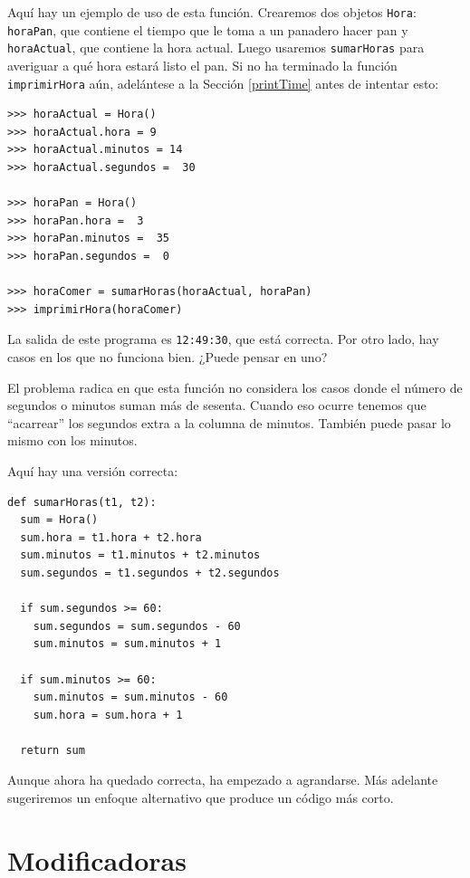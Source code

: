 Aquí hay un ejemplo de uso de esta función. Crearemos dos objetos
\texttt{Hora}: \texttt{horaPan}, que contiene el tiempo que le toma
a un panadero hacer pan y \texttt{horaActual}, que contiene la hora
actual. Luego usaremos \texttt{sumarHoras} para averiguar a qué hora
estará listo el pan. Si no ha terminado la función \texttt{imprimirHora}
aún, adelántese a la Sección \ref{printTime} antes de intentar esto:

\begin{lstlisting}
>>> horaActual = Hora()
>>> horaActual.hora = 9
>>> horaActual.minutos = 14
>>> horaActual.segundos =  30

>>> horaPan = Hora()
>>> horaPan.hora =  3
>>> horaPan.minutos =  35
>>> horaPan.segundos =  0

>>> horaComer = sumarHoras(horaActual, horaPan)
>>> imprimirHora(horaComer)
\end{lstlisting}
 La salida de este programa es \texttt{12:49:30}, que está correcta.
Por otro lado, hay casos en los que no funciona bien. ¿Puede pensar
en uno?

El problema radica en que esta función no considera los casos donde
el número de segundos o minutos suman más de sesenta. Cuando eso ocurre
tenemos que ``acarrear'' los segundos extra a la columna de minutos.
También puede pasar lo mismo con los minutos.

Aquí hay una versión correcta:
\begin{lstlisting}
def sumarHoras(t1, t2):
  sum = Hora()
  sum.hora = t1.hora + t2.hora
  sum.minutos = t1.minutos + t2.minutos
  sum.segundos = t1.segundos + t2.segundos

  if sum.segundos >= 60:
    sum.segundos = sum.segundos - 60
    sum.minutos = sum.minutos + 1

  if sum.minutos >= 60:
    sum.minutos = sum.minutos - 60
    sum.hora = sum.hora + 1

  return sum
\end{lstlisting}
Aunque ahora ha quedado correcta, ha empezado a agrandarse. Más adelante
sugeriremos un enfoque alternativo que produce un código más corto.

\section{Modificadoras}

\label{increment}  

